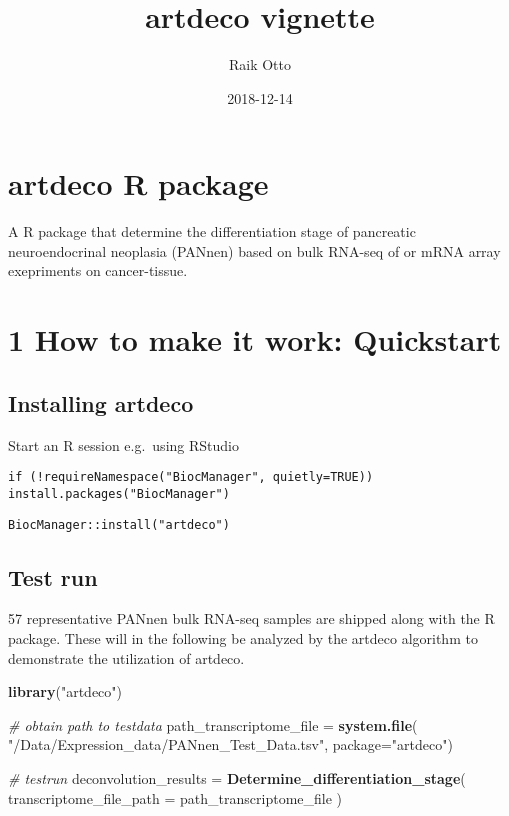 \documentclass[]{article}
\title{artdeco vignette}
\author{Raik Otto}
\date{2018-12-14}
\newenvironment{Shaded}{\begin{snugshade}}{\end{snugshade}}
\newcommand{\KeywordTok}[1]{\textcolor[rgb]{0.13,0.29,0.53}{\textbf{#1}}}
\newcommand{\DataTypeTok}[1]{\textcolor[rgb]{0.13,0.29,0.53}{#1}}
\newcommand{\StringTok}[1]{\textcolor[rgb]{0.31,0.60,0.02}{#1}}
\newcommand{\CommentTok}[1]{\textcolor[rgb]{0.56,0.35,0.01}{\textit{#1}}}
\newcommand{\NormalTok}[1]{#1}
\begin{document}
\maketitle

\section{artdeco R package}\label{artdeco-r-package}

A R package that determine the differentiation stage of pancreatic
neuroendocrinal neoplasia (PANnen) based on bulk RNA-seq of or mRNA
array exepriments on cancer-tissue.

\section{1 How to make it work:
Quickstart}\label{how-to-make-it-work-quickstart}

\subsection{Installing artdeco}\label{installing-artdeco}

Start an R session e.g.~using RStudio

\texttt{if\ (!requireNamespace("BiocManager",\ quietly=TRUE))}
\texttt{install.packages("BiocManager")}

\texttt{BiocManager::install("artdeco")}

\subsection{Test run}\label{test-run}

57 representative PANnen bulk RNA-seq samples are shipped along with the
R package. These will in the following be analyzed by the artdeco
algorithm to demonstrate the utilization of artdeco.

\begin{Shaded}
\begin{Highlighting}[]
\KeywordTok{library}\NormalTok{(}\StringTok{"artdeco"}\NormalTok{)}

\CommentTok{# obtain path to testdata}
\NormalTok{path_transcriptome_file =}\StringTok{ }\KeywordTok{system.file}\NormalTok{(}
    \StringTok{"/Data/Expression_data/PANnen_Test_Data.tsv"}\NormalTok{,}
    \DataTypeTok{package=}\StringTok{"artdeco"}\NormalTok{)}

\CommentTok{# testrun}
\NormalTok{deconvolution_results =}\StringTok{ }\KeywordTok{Determine_differentiation_stage}\NormalTok{(}
    \DataTypeTok{transcriptome_file_path =}\NormalTok{ path_transcriptome_file}
\NormalTok{)}
\end{Highlighting}
\end{Shaded}
\end{document}
